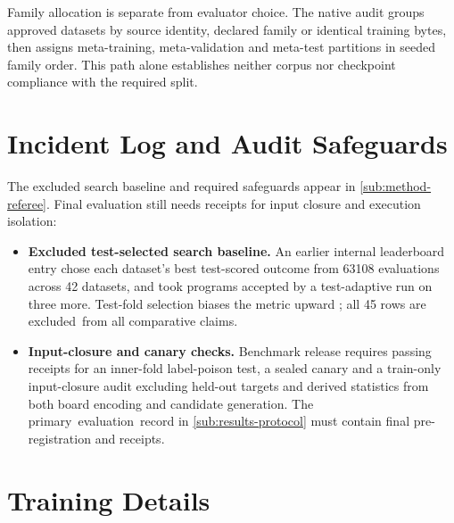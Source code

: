 Family allocation is separate from evaluator choice. The native audit
groups approved datasets by source identity, declared family or identical
training bytes, then assigns meta-training, meta-validation and meta-test
partitions in seeded family order. This path alone establishes neither
corpus nor checkpoint compliance with the required split.

\section{Incident Log and Audit Safeguards}\label{app:incidents}

The excluded search baseline and required safeguards appear in
\cref{sub:method-referee}. Final evaluation still needs receipts for
input closure and execution isolation:
\begin{itemize}[leftmargin=1.4em,itemsep=2pt,topsep=3pt]
  \item \textbf{Excluded test-selected search baseline.} An earlier internal
  leaderboard entry chose each dataset's best test-scored outcome from \num{63108}
  evaluations across 42 datasets, and took programs accepted by a test-adaptive
  run on three more. Test-fold selection biases the metric
  upward \citep{cawley2010overfitting}; all 45 rows are \mbox{excluded from}
  all comparative claims.
  \item \textbf{Input-closure and canary checks.} Benchmark release requires
  passing receipts for an inner-fold label-poison test, a sealed canary and
  a train-only input-closure audit excluding held-out targets and derived
  statistics from both board encoding and candidate generation. The \mbox{primary evaluation record}
  in \cref{sub:results-protocol} must contain final pre-registration and receipts.
\end{itemize}

\section{Training Details}\label{app:training}

